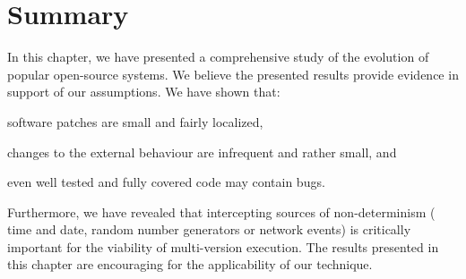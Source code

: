 \section{Summary}
\label{evolution:summary}

In this chapter, we have presented a comprehensive study of the evolution of
\numSystems popular open-source systems. We believe the presented results
provide evidence in support of our assumptions. We have shown that:%
\begin{inparaenum}[(1)]
\item software patches are small and fairly localized,
\item changes to the external behaviour are infrequent and rather small, and
\item even well tested and fully covered code may contain bugs.
\end{inparaenum}
Furthermore, we have revealed that intercepting sources of non-determinism (\eg
time and date, random number generators or network events) is critically
important for the viability of multi-version execution. The results presented
in this chapter are encouraging for the applicability of our technique.
